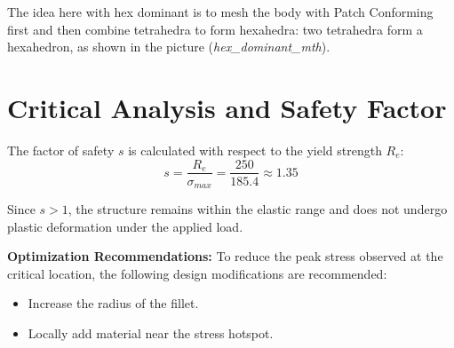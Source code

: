 \documentclass[12pt, a4paper]{article}
\begin{document}
	The idea here with hex dominant is to mesh the body with Patch Conforming first and then combine tetrahedra to form hexahedra: two tetrahedra form a hexahedron, as shown in the picture (\textit{hex\_dominant\_mth}).
	
	
	
	
	
	
	
	
	
	
	
	
		
	\section{Critical Analysis and Safety Factor}
	The factor of safety $s$ is calculated with respect to the yield strength $R_e$:
	\begin{equation}
		s = \frac{R_e}{\sigma_{max}} = \frac{250}{185.4} \approx 1.35
	\end{equation}
	
	Since $s > 1$, the structure remains within the elastic range and does not undergo plastic deformation under the applied load. 
	
	\textbf{Optimization Recommendations:}
	To reduce the peak stress observed at the critical location, the following design modifications are recommended:
	\begin{itemize}
		\item Increase the radius of the fillet.
		\item Locally add material near the stress hotspot.
	\end{itemize}
	
	
	
	
	
	
	
	
	
	
		
\end{document}
